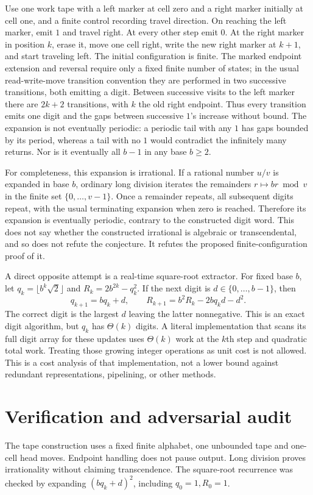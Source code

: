 \documentclass[11pt]{article}
\begin{document}
Use one work tape with a left marker at cell zero and a right marker initially
at cell one, and a finite control recording travel direction. On reaching the
left marker, emit $1$ and travel right. At every other step emit $0$. At the
right marker in position $k$, erase it, move one cell right, write the new right
marker at $k+1$, and start traveling left. The initial configuration is finite.
The marked endpoint extension and reversal require only a fixed finite number
of states; in the usual read-write-move transition convention they are performed
in two successive transitions, both emitting a digit. Between successive visits
to the left marker there are $2k+2$ transitions, with $k$ the old right endpoint.
Thus every transition emits one digit and the gaps between successive $1$'s
increase without bound. The expansion is not eventually periodic: a periodic
tail with any $1$ has gaps bounded by its period, whereas a tail with no $1$
would contradict the infinitely many returns. Nor is it eventually all $b-1$
in any base $b\ge2$.

For completeness, this expansion is irrational. If a rational number $u/v$
is expanded in base $b$, ordinary long division iterates the remainders
$r\mapsto br\bmod v$ in the finite set $\{0,\ldots,v-1\}$. Once a remainder
repeats, all subsequent digits repeat, with the usual terminating expansion
when zero is reached. Therefore its expansion is eventually periodic, contrary
to the constructed digit word. This does not say whether the constructed
irrational is algebraic or transcendental, and so does not refute the conjecture.
It refutes the proposed finite-configuration proof of it.

A direct opposite attempt is a real-time square-root extractor. For fixed
base $b$, let $q_k=\lfloor b^k\sqrt2\rfloor$ and
$R_k=2b^{2k}-q_k^2$. If the next digit is $d\in\{0,\ldots,b-1\}$, then
\[
 q_{k+1}=bq_k+d,\qquad
 R_{k+1}=b^2R_k-2bq_kd-d^2.
\]
The correct digit is the largest $d$ leaving the latter nonnegative. This is an
exact digit algorithm, but $q_k$ has $\Theta(k)$ digits. A literal implementation
that scans its full digit array for these updates uses $\Theta(k)$ work at the
$k$th step and quadratic total work. Treating those growing integer operations
as unit cost is not allowed. This is a cost analysis of that implementation,
not a lower bound against redundant representations, pipelining, or other methods.
\section{Verification and adversarial audit}
The tape construction uses a fixed finite alphabet, one unbounded tape and
one-cell head moves. Endpoint handling does not pause output. Long division
proves irrationality without claiming transcendence. The square-root recurrence
was checked by expanding $(bq_k+d)^2$, including $q_0=1,R_0=1$.
\end{document}

